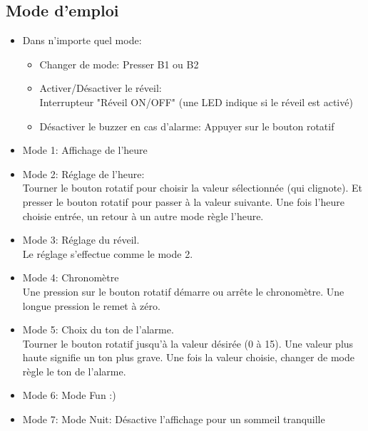 \documentclass[a4paper, 11pt]{article}
\begin{document}
\subsection{Mode d'emploi}
\begin{minipage}{0.6\textwidth}
\begin{itemize}
\item Dans n'importe quel mode:
\begin{itemize}
\item Changer de mode: Presser B1 ou B2
\item Activer/Désactiver le réveil: \\Interrupteur "Réveil ON/OFF" (une LED indique si le réveil est activé)
\item Désactiver le buzzer en cas d'alarme: Appuyer sur le bouton rotatif
\end{itemize}
\item Mode 1: Affichage de l'heure
\item Mode 2: Réglage de l'heure:\\
Tourner le bouton rotatif pour choisir la valeur sélectionnée (qui clignote). Et presser le bouton rotatif pour passer à la valeur suivante. Une fois l'heure choisie entrée, un retour à un autre mode règle l'heure.
\item Mode 3: Réglage du réveil.\\Le réglage s'effectue comme le mode 2.
\item Mode 4: Chronomètre\\
Une pression sur le bouton rotatif démarre ou arrête le chronomètre. Une longue pression le remet à zéro.
\item Mode 5: Choix du ton de l'alarme.\\ Tourner le bouton rotatif jusqu'à la valeur désirée (0 à 15). Une valeur plus haute signifie un ton plus grave. Une fois la valeur choisie, changer de mode règle le ton de l'alarme.
\item Mode 6: Mode Fun :)
\item Mode 7: Mode Nuit: Désactive l'affichage pour un sommeil tranquille
\end{itemize}
\end{minipage}
\end{document}
